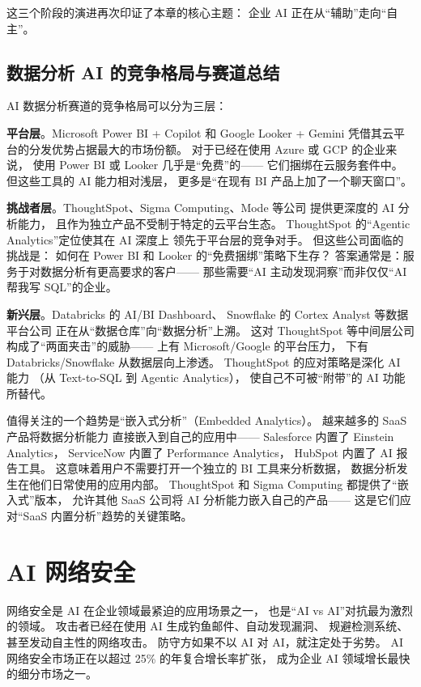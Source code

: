 这三个阶段的演进再次印证了本章的核心主题：
企业 AI 正在从``辅助''走向``自主''。

\subsection{数据分析 AI 的竞争格局与赛道总结}

AI 数据分析赛道的竞争格局可以分为三层：

\textbf{平台层}。Microsoft Power BI + Copilot 和 Google Looker + Gemini
凭借其云平台的分发优势占据最大的市场份额。
对于已经在使用 Azure 或 GCP 的企业来说，
使用 Power BI 或 Looker 几乎是``免费''的——
它们捆绑在云服务套件中。
但这些工具的 AI 能力相对浅层，
更多是``在现有 BI 产品上加了一个聊天窗口''。

\textbf{挑战者层}。ThoughtSpot、Sigma Computing、Mode 等公司
提供更深度的 AI 分析能力，
且作为独立产品不受制于特定的云平台生态。
ThoughtSpot 的``Agentic Analytics''定位使其在 AI 深度上
领先于平台层的竞争对手。
但这些公司面临的挑战是：
如何在 Power BI 和 Looker 的``免费捆绑''策略下生存？
答案通常是：服务于对数据分析有更高要求的客户——
那些需要``AI 主动发现洞察''而非仅仅``AI 帮我写 SQL''的企业。

\textbf{新兴层}。Databricks 的 AI/BI Dashboard、
Snowflake 的 Cortex Analyst 等数据平台公司
正在从``数据仓库''向``数据分析''上溯。
这对 ThoughtSpot 等中间层公司构成了``两面夹击''的威胁——
上有 Microsoft/Google 的平台压力，
下有 Databricks/Snowflake 从数据层向上渗透。
ThoughtSpot 的应对策略是深化 AI 能力
（从 Text-to-SQL 到 Agentic Analytics），
使自己不可被``附带''的 AI 功能所替代。

值得关注的一个趋势是``嵌入式分析''（Embedded Analytics）。
越来越多的 SaaS 产品将数据分析能力
直接嵌入到自己的应用中——
Salesforce 内置了 Einstein Analytics，
ServiceNow 内置了 Performance Analytics，
HubSpot 内置了 AI 报告工具。
这意味着用户不需要打开一个独立的 BI 工具来分析数据，
数据分析发生在他们日常使用的应用内部。
ThoughtSpot 和 Sigma Computing 都提供了``嵌入式''版本，
允许其他 SaaS 公司将 AI 分析能力嵌入自己的产品——
这是它们应对``SaaS 内置分析''趋势的关键策略。


\section{AI 网络安全}
\label{sec:ent-security}

网络安全是 AI 在企业领域最紧迫的应用场景之一，
也是``AI vs AI''对抗最为激烈的领域。
攻击者已经在使用 AI 生成钓鱼邮件、自动发现漏洞、
规避检测系统、甚至发动自主性的网络攻击。
防守方如果不以 AI 对 AI，就注定处于劣势。
AI 网络安全市场正在以超过 25\% 的年复合增长率扩张，
成为企业 AI 领域增长最快的细分市场之一。

